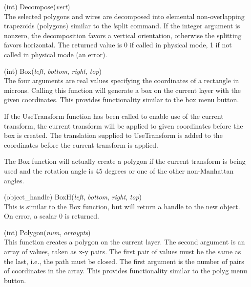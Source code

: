\begin{description}
\item{(int) \vt Decompose({\it vert\/})}\\
The selected polygons and wires are decomposed into elemental
non-overlapping trapezoids (polygons) similar to the {\cb !split}
command.  If the integer argument is nonzero, the decomposition favors
a vertical orientation, otherwise the splitting favors horizontal. 
The returned value is 0 if called in physical mode, 1 if not called in
physical mode (an error).

\item{(int) \vt Box({\it left\/}, {\it bottom\/}, {\it right\/},
 {\it top\/})}\\
The four arguments are real values specifying the coordinates of a
rectangle in microns.  Calling this function will generate a box on
the current layer with the given coordinates.  This provides
functionality similar to the {\cb box} menu button.

If the {\vt UseTransform} function has been called to enable use of
the current transform, the current transform will be applied to given
coordinates before the box is created.  The translation supplied to
{\vt UseTransform} is added to the coordinates before the current
transform is applied.

The {\vt Box} function will actually create a polygon if the current
transform is being used and the rotation angle is 45 degrees or one of
the other non-Manhattan angles.

\item{(object\_handle) \vt BoxH({\it left\/}, {\it bottom\/}, {\it right\/},
 {\it top\/})}\\
This is similar to the {\vt Box} function, but will return a handle to
the new object.  On error, a scalar 0 is returned.

\item{(int) \vt Polygon({\it num\/}, {\it arraypts\/})}\\
This function creates a polygon on the current layer.  The second
argument is an array of values, taken as x-y pairs.  The first pair of
values must be the same as the last, i.e., the path must be closed. 
The first argument is the number of pairs of coordinates in the array. 
This provides functionality similar to the {\cb polyg} menu button.


\end{description}
